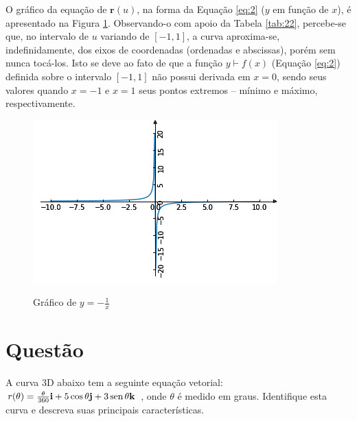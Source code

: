 \documentclass[a4paper,11pt,pagenumber=true]{article}
\newcommand{\sen}{\text{\,sen\,}}
\theoremstyle{mytheor}
\begin{document}
            O gráfico da equação de $\mathbf{r}(u)$, na forma da Equação \ref{eq:2} ($y$ em função de $x$), é apresentado na Figura \ref{fig:q2}. Observando-o com apoio da Tabela \ref{tab:22}, percebe-se que, no intervalo de $u$ variando de $[-1, 1]$, a curva aproxima-se, indefinidamente, dos eixos de coordenadas (ordenadas e abscissas), porém sem nunca tocá-los. Isto se deve ao fato de que a função $y \vdash f(x)$ (Equação \ref{eq:2}) definida sobre o intervalo $[-1, 1]$ não possui derivada em $x=0$, sendo seus valores quando $x= -1$ e $x = 1$ seus pontos extremos -- mínimo e máximo, respectivamente.
            
            \begin{figure}[h]
            \centering
                \includegraphics[width=.9\textwidth]{images/q-2.png}
                \label{fig:q2}
                \caption{Gráfico de $y = -\frac{1}{x}$}
            \end{figure}
        
            \clearpage
            
    \section{Questão }

        A curva 3D abaixo tem a seguinte equação vetorial: 
        $r(\theta) =    \frac{\theta}{360} \mathbf{ i} + 
                        5 \cos \theta \mathbf{ j} + 
                        3 \sen \theta \mathbf{ k}$
        , onde $\theta$ é medido em graus. Identifique esta curva e descreva suas principais características.
\end{document}
